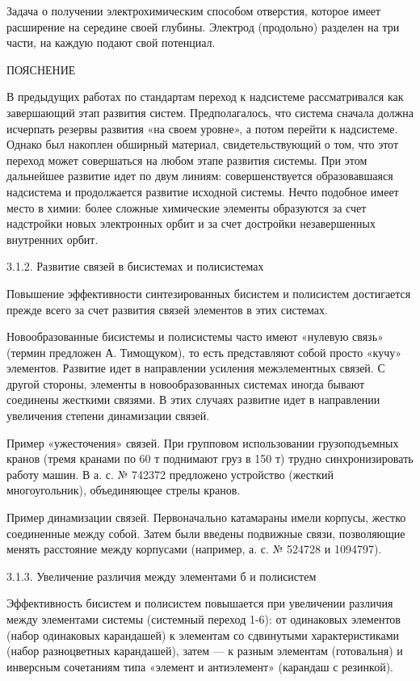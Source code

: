 Задача о получении электрохимическим способом отверстия, которое имеет
расширение на середине своей глубины. Электрод (продольно) разделен на
три части, на каждую подают свой потенциал.


ПОЯСНЕНИЕ

В предыдущих работах по стандартам переход к надсистеме рассматривался
как  завершающий этап  развития  систем.  Предполагалось, что  система
сначала  должна  исчерпать  резервы  развития  «на  своем  уровне»,  а
потом  перейти к  надсистеме. Однако  был накоплен  обширный материал,
свидетельствующий о том,  что этот переход может  совершаться на любом
этапе  развития системы.  При этом  дальнейшее развитие  идет по  двум
линиям:  совершенствуется  образовавшаяся  надсистема  и  продолжается
развитие исходной системы.  Нечто подобное имеет место  в химии: более
сложные  химические  элементы  образуются  за  счет  надстройки  новых
электронных орбит и за счет достройки незавершенных внутренних орбит.


3.1.2. Развитие связей в бисистемах и полисистемах

Повышение   эффективности   синтезированных  бисистем   и   полисистем
достигается  прежде всего  за счет  развития связей  элементов в  этих
системах.

Новообразованные бисистемы  и полисистемы часто имеют  «нулевую связь»
(термин  предложен А.  Тимощуком), то  есть представляют  собой просто
«кучу» элементов.  Развитие идет в направлении  усиления межэлементных
связей. С другой стороны,  элементы в новообразованных системах иногда
бывают  соединены жесткими  связями. В  этих случаях  развитие идет  в
направлении увеличения степени динамизации связей.

Пример    «ужесточения»    связей.   При    групповом    использовании
грузоподъемных кранов (тремя  кранами по 60 т поднимают груз  в 150 т)
трудно  синхронизировать работу  машин. В  а. с.  № 742372  предложено
устройство (жесткий многоугольник), объединяющее стрелы кранов.

Пример  динамизации связей.  Первоначально  катамараны имели  корпусы,
жестко соединенные  между собой.  Затем были введены  подвижные связи,
позволяющие  менять  расстояние между  корпусами  (например,  а. с.  №
524728 и 1094797).


3.1.3. Увеличение различия между элементами б и полисистем

Эффективность бисистем и полисистем повышается при увеличении различия
между  элементами  системы  (системный  переход  1-6):  от  одинаковых
элементов  (набор одинаковых  карандашей)  к  элементам со  сдвинутыми
характеристиками  (набор разноцветных  карандашей), затем  — к  разным
элементам  (готовальня)   и  инверсным  сочетаниям  типа   «элемент  и
антиэлемент» (карандаш с резинкой).


